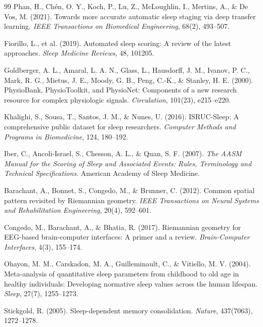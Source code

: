\documentclass[a4paper,fleqn]{cas-dc}
\begin{document}
\begin{thebibliography}{99}
 Phan, H., Chén, O. Y., Koch, P., Lu, Z., McLoughlin, I., Mertins, A., \& De Vos, M. (2021). Towards more accurate automatic sleep staging via deep transfer learning. \textit{IEEE Transactions on Biomedical Engineering}, 68(2), 493--507.

 Fiorillo, L., et al. (2019). Automated sleep scoring: A review of the latest approaches. \textit{Sleep Medicine Reviews}, 48, 101205.

 Goldberger, A. L., Amaral, L. A. N., Glass, L., Hausdorff, J. M., Ivanov, P. C., Mark, R. G., Mietus, J. E., Moody, G. B., Peng, C.-K., \& Stanley, H. E. (2000). PhysioBank, PhysioToolkit, and PhysioNet: Components of a new research resource for complex physiologic signals. \textit{Circulation}, 101(23), e215--e220.

 Khalighi, S., Sousa, T., Santos, J. M., \& Nunes, U. (2016). ISRUC-Sleep: A comprehensive public dataset for sleep researchers. \textit{Computer Methods and Programs in Biomedicine}, 124, 180--192.

 Iber, C., Ancoli-Israel, S., Chesson, A. L., \& Quan, S. F. (2007). \textit{The AASM Manual for the Scoring of Sleep and Associated Events: Rules, Terminology and Technical Specifications}. American Academy of Sleep Medicine.

 Barachant, A., Bonnet, S., Congedo, M., \& Brunner, C. (2012). Common spatial pattern revisited by Riemannian geometry. \textit{IEEE Transactions on Neural Systems and Rehabilitation Engineering}, 20(4), 592--601.

 Congedo, M., Barachant, A., \& Bhatia, R. (2017). Riemannian geometry for EEG-based brain-computer interfaces: A primer and a review. \textit{Brain-Computer Interfaces}, 4(3), 155--174.

 Ohayon, M. M., Carskadon, M. A., Guilleminault, C., \& Vitiello, M. V. (2004). Meta-analysis of quantitative sleep parameters from childhood to old age in healthy individuals: Developing normative sleep values across the human lifespan. \textit{Sleep}, 27(7), 1255--1273.

 Stickgold, R. (2005). Sleep-dependent memory consolidation. \textit{Nature}, 437(7063), 1272--1278.


\end{thebibliography}
\end{document}
